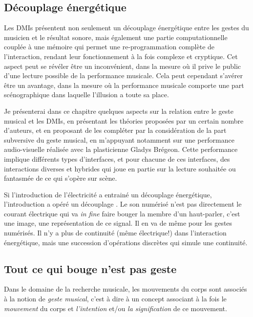 \subsection{Découplage énergétique}

Les \glspl{DMI} présentent non seulement un découplage énergétique entre les gestes du musicien et le résultat sonore, mais également une partie computationnelle couplée à une mémoire qui permet une re-programmation complète de l'interaction, rendant leur fonctionnement à la fois complexe et cryptique. Cet aspect peut se révéler être un inconvénient, dans la mesure où il prive le public d’une lecture possible de la performance musicale. Cela peut cependant s’avérer être un avantage, dans la mesure où la performance musicale comporte une part scénographique dans laquelle l’illusion a toute sa place.

Je présenterai dans ce chapitre quelques aspects sur la relation entre le geste musical et les \glspl{DMI}, en présentant les théories proposées par un certain nombre d'auteurs, et en proposant de les compléter par la considération de la part subversive du geste musical, en m'appuyant notamment sur une performance audio-visuelle réalisée avec la plasticienne Gladys Brégeon. Cette performance implique différents types d’interfaces, et pour chacune de ces interfaces, des interactions diverses et hybrides qui joue en partie sur la lecture souhaitée ou fantasmée de ce qui s’opère sur scène.


Si l'introduction de l'électricité a entrainé un découplage énergétique, l'introduction a opéré un découplage . Le son numérisé n'est pas directement le courant électrique qui va \textit{in fine} faire bouger la membre d'un haut-parler, c'est une image, une représentation de ce signal. Il en va de même pour les gestes numérisés. Il n'y a plus de continuité (même électrique!) dans l'interaction énergétique, mais une succession d'opérations discrètes qui simule une continuité. 

\subsection{Tout ce qui bouge n'est pas geste}

Dans le domaine de la recherche musicale, les mouvements du corps sont associés à la notion de \textit{geste musical}, c'est à dire à un concept associant à la fois le \textit{mouvement} du corps et \textit{l'intention} et/ou \textit{la signification} de ce mouvement. 

